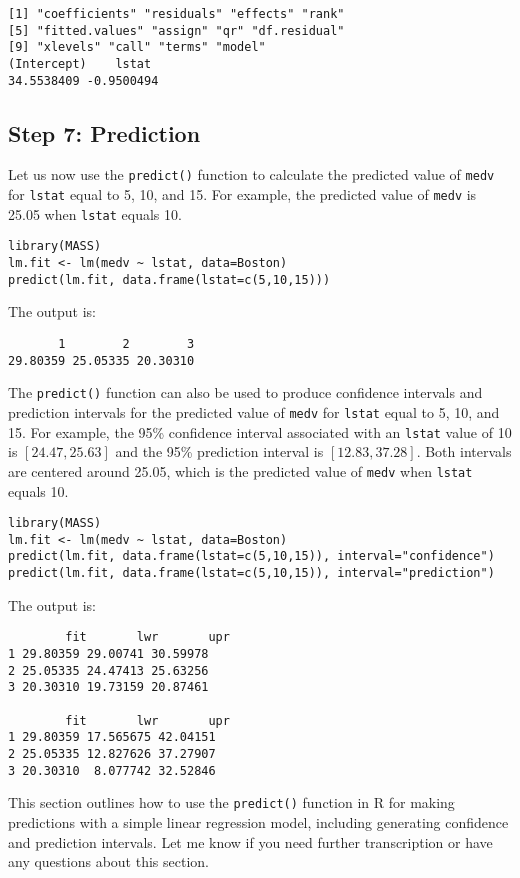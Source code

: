 \documentclass[11pt]{article}
\begin{document}
\begin{verbatim}
[1] "coefficients" "residuals" "effects" "rank"
[5] "fitted.values" "assign" "qr" "df.residual"
[9] "xlevels" "call" "terms" "model"
(Intercept)    lstat
34.5538409 -0.9500494
\end{verbatim}

\subsection{Step 7: Prediction}

Let us now use the \texttt{predict()} function to calculate the predicted value of \texttt{medv} for \texttt{lstat} equal to 5, 10, and 15. For example, the predicted value of \texttt{medv} is 25.05 when \texttt{lstat} equals 10.

\begin{verbatim}
library(MASS)
lm.fit <- lm(medv ~ lstat, data=Boston)
predict(lm.fit, data.frame(lstat=c(5,10,15)))
\end{verbatim}

The output is:

\begin{verbatim}
       1        2        3
29.80359 25.05335 20.30310
\end{verbatim}

The \texttt{predict()} function can also be used to produce confidence intervals and prediction intervals for the predicted value of \texttt{medv} for \texttt{lstat} equal to 5, 10, and 15. For example, the 95\% confidence interval associated with an \texttt{lstat} value of 10 is \([24.47, 25.63]\) and the 95\% prediction interval is \([12.83, 37.28]\). Both intervals are centered around 25.05, which is the predicted value of \texttt{medv} when \texttt{lstat} equals 10.

\begin{verbatim}
library(MASS)
lm.fit <- lm(medv ~ lstat, data=Boston)
predict(lm.fit, data.frame(lstat=c(5,10,15)), interval="confidence")
predict(lm.fit, data.frame(lstat=c(5,10,15)), interval="prediction")
\end{verbatim}

The output is:

\begin{verbatim}
        fit       lwr       upr
1 29.80359 29.00741 30.59978
2 25.05335 24.47413 25.63256
3 20.30310 19.73159 20.87461

        fit       lwr       upr
1 29.80359 17.565675 42.04151
2 25.05335 12.827626 37.27907
3 20.30310  8.077742 32.52846
\end{verbatim}

This section outlines how to use the \texttt{predict()} function in R for making predictions with a simple linear regression model, including generating confidence and prediction intervals. Let me know if you need further transcription or have any questions about this section.
\end{document}
